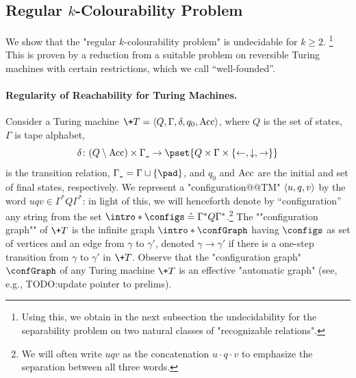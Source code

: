 \subsection{
    \AP\label{sec:dichotomy-k-regular-colourability}%
    Regular $k$-Colourability Problem
}

We show that the "regular $k$-colourability problem" is undecidable for $k\geq 2$.%
\footnote{
    Using this, we obtain in the next subsection 
    the undecidability for the separability problem on two natural classes of 
    "recognizable relations".
}
This is proven by a reduction from a suitable problem on reversible 
Turing machines with certain restrictions, which we call ``well-founded''.

\paragraph*{Regularity of Reachability for Turing Machines.}
Consider a Turing machine $\+T = \tup{Q,\Gamma,\delta,q_0,\Acc}$, where $Q$ is the set of states, $\Gamma$ is tape alphabet,
\[
    \delta\colon (Q \setminus \Acc) \times \Gamma_{\smallpad} \to \pset{Q \times \Gamma \times \set{\leftarrow, \downarrow, \rightarrow}}
\]
is the transition relation, $\Gamma_{\smallpad} = \Gamma \dcup \set{\pad}$, and $q_0$ and $\textrm{Acc}$ are the initial and set of final states, respectively.
%
We represent a "configuration@@TM" $\langle u, q, v\rangle$ by the word $uqv \in \Gamma^* Q \Gamma^*$:
in light of this, we will henceforth denote by ``configuration'' any string from the set  \AP$\intro*\configs \defeq  \Gamma^* Q \Gamma^*$.\footnote{We will often write
$uqv$ as the concatenation $u\cdot q \cdot v$ to emphasize
the separation between all three words.}
The \AP""configuration graph"" of $\+T$ is the infinite graph $\intro*\confGraph$ having $\configs$ as set of vertices and an edge from $\gamma$ to $\gamma'$, denoted $\gamma \rightarrow \gamma'$ if there is a one-step transition from $\gamma$ to $\gamma'$ in $\+T$. Observe that the "configuration graph" $\confGraph$ of any Turing machine $\+T$ is an effective "automatic graph" (see, e.g., \cite{KuskeLohrey2010AutomaticGraphs} TODO:update pointer to prelims).

